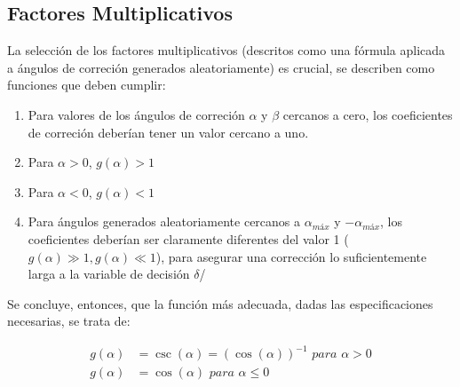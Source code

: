 \documentclass[a4paper]{report}
\begin{document}
\subsection{Factores Multiplicativos}
La selecci\'on de los factores multiplicativos (descritos como una f\'ormula aplicada
 a \'angulos de correci\'on generados aleatoriamente) es crucial, se describen como funciones
 que deben cumplir:
\begin{enumerate}
\item Para valores de los \'angulos de correci\'on $\alpha$ y $\beta$ cercanos a cero,
  los coeficientes de correci\'on deber\'ian tener un valor cercano a uno.
  \item Para $\alpha > 0$, $g(\alpha) > 1$
  \item Para $\alpha < 0$, $g(\alpha) < 1$
  \item Para \'angulos generados aleatoriamente cercanos a $\alpha_{\textit{m\'ax}}$ y $-\alpha_{\textit{m\'ax}}$,
    los coeficientes deber\'ian ser claramente diferentes del valor 1 ($g(\alpha) \gg 1,
    g(\alpha) \ll 1$), para asegurar una correcci\'on lo suficientemente larga a la variable
    de decisi\'on $\delta$/
  \end{enumerate}

  Se concluye, entonces, que la funci\'on m\'as adecuada, dadas las especificaciones necesarias,
  se trata de:

  \begin{align*}
    g(\alpha) &= \csc(\alpha) = (\cos(\alpha))^{-1} \textit{ para } \alpha > 0\\
    g(\alpha) &= \cos(\alpha) \textit{ para } \alpha \leq 0\\
  \end{align*}
\end{document}
